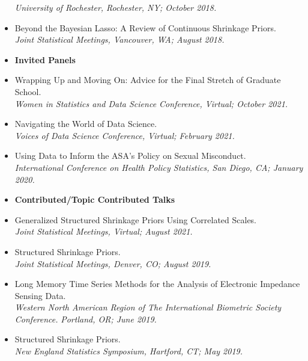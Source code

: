 \documentclass[11pt]{article}
\newcommand{\tab}{\hspace*{2em}}
\begin{document}
\begin{itemize}
	\tab \emph{University of Rochester, Rochester, NY; October 2018.} \vspace{-2mm}
	\item[] Beyond the Bayesian Lasso: A Review of Continuous Shrinkage Priors. \\
	\tab \emph{Joint Statistical Meetings, Vancouver, WA; August 2018.} \vspace{-2mm}
	\item[] \textbf{Invited Panels} \vspace{-2mm}
	\item[] Wrapping Up and Moving On: Advice for the Final Stretch of Graduate School. \\
	\tab \emph{Women in Statistics and Data Science Conference, Virtual; October 2021.} \vspace{-2mm}
	\item[] Navigating the World of Data Science. \\
	\tab \emph{Voices of Data Science Conference, Virtual; February 2021.} \vspace{-2mm}
	\item[] Using Data to Inform the ASA's Policy on Sexual Misconduct. \\
	\tab \emph{International Conference on Health Policy Statistics, San Diego, CA; January 2020.} \vspace{-2mm}
	\item[] \textbf{Contributed/Topic Contributed Talks} \vspace{-2mm}
	\item[] Generalized Structured Shrinkage Priors Using Correlated Scales. \\
	\tab \emph{Joint Statistical Meetings, Virtual; August 2021.} \vspace{-2mm}
	\item[] Structured Shrinkage Priors. \\
	\tab \emph{Joint Statistical Meetings, Denver, CO; August 2019.} \vspace{-2mm}
	\item[] Long Memory Time Series Methods for the Analysis of Electronic Impedance Sensing Data. \\
	\tab \emph{Western North American Region of The International Biometric Society Conference.}
	\tab \emph{Portland, OR; June 2019.} \vspace{-2mm}
	\item[] Structured Shrinkage Priors. \\
	\tab \emph{New England Statistics Symposium, Hartford, CT; May 2019.} \vspace{-2mm}

\end{itemize}
\end{document}
